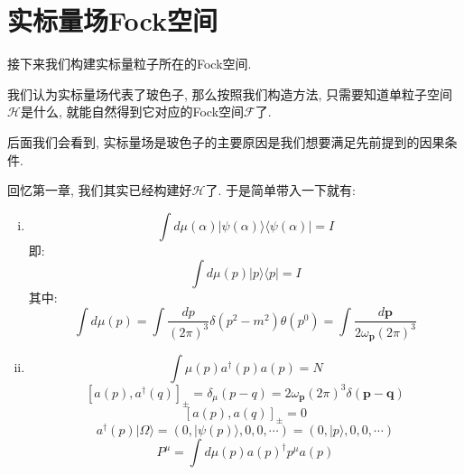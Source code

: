 \section{实标量场Fock空间}
接下来我们构建实标量粒子所在的Fock空间.\par
我们认为实标量场代表了玻色子, 那么按照我们构造方法, 只需要知道单粒子空间$\mathcal{H}$是什么, 就能自然得到它对应的Fock空间$\mathcal{F}$了.\par
\begin{remark}
    后面我们会看到, 实标量场是玻色子的主要原因是我们想要满足先前提到的因果条件.
\end{remark}
回忆第一章, 我们其实已经构建好$\mathcal{H}$了. 于是简单带入一下就有:
\begin{enumerate}[(i)]
    \item
    \begin{equation}
        \int d\mu(\alpha) |\psi(\alpha)\rangle\langle\psi(\alpha)|=I
    \end{equation}
    即:
    \begin{equation}
        \int d\mu(p)|p\rangle\langle p|=I
    \end{equation}
    其中:
    \begin{equation}
        \int d\mu(p)=\int \frac{dp}{(2\pi)^3}\delta(p^2-m^2)\theta(p^0)=\int \frac{d\mathbf{p}}{2\omega_\mathbf{p}(2\pi)^3}
    \end{equation}
    \item
    \begin{equation}
        \int\mu(p)a^\dagger(p)a(p)=N
    \end{equation}
    \begin{equation}
        {[a(p), a^\dagger(q)]}_\pm=\delta_\mu(p-q)=2\omega_\mathbf{p}(2\pi)^3\delta(\mathbf{p}-\mathbf{q})
    \end{equation}
    \begin{equation}
        {[a(p), a(q)]}_\pm=0
    \end{equation}
    \begin{equation}
        a^\dagger(p)|\Omega\rangle=(0,|\psi(p)\rangle,0,0,\cdots)=(0,|p\rangle,0,0,\cdots)
    \end{equation}
    \begin{equation}
        P^\mu=\int d\mu(p)a(p)^\dagger p^\mu a(p)
    \end{equation}
\end{enumerate}


\ifx\ALL\undefined

\fi